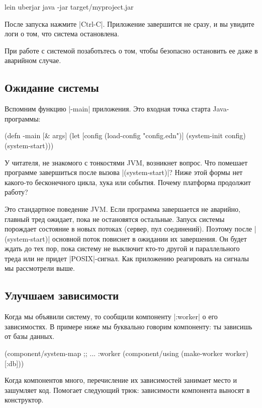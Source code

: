 \begin{code}
lein uberjar
java -jar target/myproject.jar
\end{code}

После запуска нажмите \spverb|Ctrl-C|. Приложение завершится не сразу, и вы увидите
логи о том, что система остановлена.

При работе с системой позаботьтесь о том, чтобы безопасно остановить ее даже в
аварийном случае.

\subsection{Ожидание системы}

Вспомним функцию \spverb|-main| приложения. Это входная точка старта Java-программы:

\begin{code}
(defn -main [& args]
  (let [config (load-config "config.edn")]
    (system-init config)
    (system-start)))
\end{code}

У читателя, не знакомого с тонкостями JVM, возникнет вопрос. Что помешает
программе завершиться после вызова \spverb|(system-start)|? Ниже этой формы нет
какого-то бесконечного цикла, хука или события. Почему платформа продолжит
работу?

Это стандартное поведение JVM. Если программа завершается не аварийно, главный
тред ожидает, пока не остановятся остальные. Запуск системы порождает состояние
в новых потоках (сервер, пул соединений). Поэтому после \spverb|(system-start)|
основной поток повиснет в ожидании их завершения. Он будет ждать до тех пор,
пока систему не выключит кто-то другой и параллельного треда или не придет
\spverb|POSIX|-сигнал. Как приложению реагировать на сигналы мы рассмотрели выше.

\subsection{Улучшаем зависимости}

Когда мы объявили систему, то сообщили компоненту \spverb|:worker| о его
зависимостях. В примере ниже мы буквально говорим компоненту: ты зависишь от
базы данных.

\begin{code}
(component/system-map
 ;; ...
 :worker (component/using
          (make-worker worker) [:db]))
\end{code}

Когда компонентов много, перечисление их зависимостей занимает место и зашумляет
код. Помогает следующий трюк: зависимости компонента выносят в конструктор.

